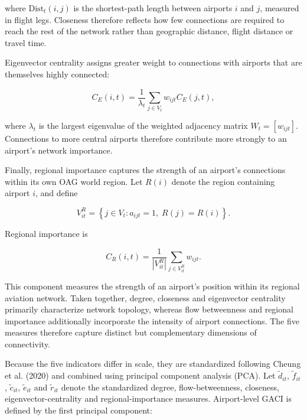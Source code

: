 \documentclass[12pt]{extarticle}
\begin{document}
where $\mathrm{Dist}_t(i,j)$ is the shortest-path length between airports $i$ and $j$, measured in flight legs. Closeness therefore reflects how few connections are required to reach the rest of the network rather than geographic distance, flight distance or travel time.

Eigenvector centrality assigns greater weight to connections with airports that are themselves highly connected:

\begin{equation}
C_E(i,t)
=
\frac{1}{\lambda_t}
\sum_{j\in V_t}
w_{ijt} C_E(j,t),
\label{eq:nature_14}
\end{equation}

where $\lambda_t$ is the largest eigenvalue of the weighted adjacency matrix $W_t=[w_{ijt}]$. Connections to more central airports therefore contribute more strongly to an airport's network importance.

Finally, regional importance captures the strength of an airport's connections within its own OAG world region. Let $R(i)$ denote the region containing airport $i$, and define

\begin{equation}
V^R_{it}
=
\left\{
j\in V_t:
a_{ijt}=1,\;
R(j)=R(i)
\right\}.
\label{eq:nature_15}
\end{equation}

Regional importance is

\begin{equation}
C_R(i,t)
=
\frac{1}{|V^R_{it}|}
\sum_{j\in V^R_{it}}
w_{ijt}.
\label{eq:nature_16}
\end{equation}

This component measures the strength of an airport's position within its regional aviation network. Taken together, degree, closeness and eigenvector centrality primarily characterize network topology, whereas flow betweenness and regional importance additionally incorporate the intensity of airport connections. The five measures therefore capture distinct but complementary dimensions of connectivity.

Because the five indicators differ in scale, they are standardized following Cheung et al. (2020) and combined using principal component analysis (PCA). Let $\tilde d_{it}$, $\tilde f_{it}$, $\tilde c_{it}$, $\tilde e_{it}$ and $\tilde r_{it}$ denote the standardized degree, flow-betweenness, closeness, eigenvector-centrality and regional-importance measures. Airport-level GACI is defined by the first principal component:
\end{document}
